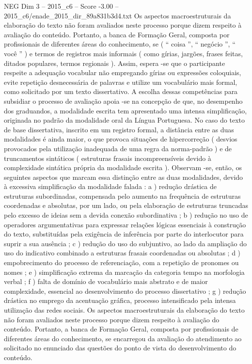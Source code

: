 \begin{textsample}{NEG Dim 3 – 2015\_c6 – Score -3.00 – 2015\_c6/enade\_2015\_dir\_89a831b3d4.txt}
Os aspectos macroestruturais da elaboração do texto não foram avaliados neste processo porque dizem respeito à avaliação do conteúdo.
Portanto, a banca de Formação Geral, composta por profissionais de diferentes áreas do conhecimento, se ( “ coisa ”, “ negócio ”, “ você ” ) e termos de registros mais informais ( como gírias, jargões, frases feitas, ditados populares, termos regionais ).
Assim, espera -se que o participante respeite a adequação vocabular não empregando gírias ou expressões coloquiais, evite repetição desnecessária de palavras e utilize um vocabulário mais formal, como solicitado por um texto dissertativo.
A escolha dessas competências para subsidiar o processo de avaliação apoia -se na concepção de que, no desempenho dos graduandos, a modalidade escrita tem apresentado uma intensa simplificação, originada no padrão da modalidade oral da Língua Portuguesa.
No caso do texto de base dissertativa, inscrito em um registro formal, a distância entre as duas modalidades é ainda maior, o que provoca situações de hipercorreção ( desvios provocados pela utilização inadequada de uma regra da norma-padrão ) e de truncamentos sintáticos ( estruturas frasais incompreensíveis devido à complexidade sintática própria da modalidade escrita ).
Observam -se, então, os seguintes aspectos que marcam essa distinção entre as duas modalidades, devido à excessiva simplificação da modalidade falada : a ) redução drástica de estruturas subordinadas, compensada pelo aumento na frequência de estruturas coordenadas e absolutas, por um lado, ou pela elaboração de estruturas truncadas pelo excesso de ideias sem a devida conexão subordinativa ; b ) redução no uso de operadores argumentativas para expressar relações lógicas essenciais à construção do texto, substituídas pela exigência de inferência por parte do interlocutor para suprir a sua ausência ; c ) redução do uso do subjuntivo, ao lado da ampliação do uso do indicativo combinado a estruturas frasais coordenadas ou absolutas ; d ) empobrecimento do processo de referenciação, com a repetição de pronomes ou nomes ; e ) simplificação extrema da marcação da categoria tempo na morfologia verbal ; f ) falta de domínio de vocabulário mais abstrato e de maior complexidade, essencial ao desenvolvimento do processo dissertativo ; g ) redução drástica no emprego da acentuação gráfica, processo intensificado pela intensa utilização das redes sociais.
Os aspectos macroestruturais da elaboração do texto não foram avaliados neste processo porque dizem respeito à avaliação do conteúdo.
Portanto, a banca de Formação Geral, composta por profissionais de diferentes áreas do conhecimento, se encarregou da avaliação do atendimento ao solicitado no enunciado das questões do ponto de vista do desenvolvimento do conteúdo.

\end{textsample}
